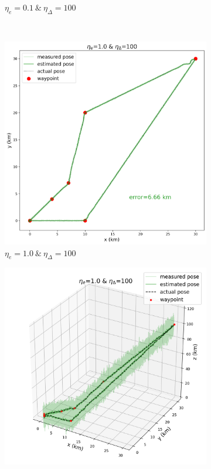 \begin{figure}[]
\begin{subfigure}[t]{0.24\textwidth}
		\caption{$\eta_e=0.1\:\&\:\eta_\Delta=100$}
	\end{subfigure} \\
	\hfill
	\begin{subfigure}[t]{0.24\textwidth}
		\centering
		\includegraphics[width=\linewidth]{figures/lookahead_eta_10_100_2d.png}
		\caption{$\eta_e=1.0\:\&\:\eta_\Delta=100$}
	\end{subfigure} 
	\hfill
	\begin{subfigure}[t]{0.24\textwidth}
		\centering
		\includegraphics[width=\linewidth]{figures/lookahead_eta_10_100_3d.png}

\end{subfigure}
\end{figure}

